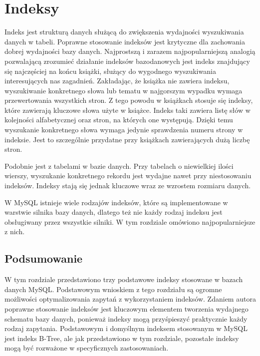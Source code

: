 \section{Indeksy}
Indeks jest strukturą danych służącą do zwiększenia wydajności wyszukiwania danych w tabeli. Poprawne stosowanie indeksów jest krytyczne dla zachowania dobrej wydajności bazy danych.
Najprostszą i zarazem najpopularniejszą analogią pozwalającą zrozumieć działanie indeksów bazodanowych jest indeks znajdujący się najczęściej na końcu książki, służący do wygodnego wyszukiwania interesujących nas zagadnień. Zakładając, że książka nie zawiera indeksu, wyszukiwanie konkretnego słowa lub tematu w najgorszym wypadku wymaga przewertowania wszystkich stron. Z tego powodu w książkach stosuje się indeksy, które zawierają kluczowe słowa użyte w książce. Indeks taki zawiera listę słów w kolejności alfabetycznej oraz stron, na których one występują. Dzięki temu wyszukanie konkretnego słowa wymaga jedynie sprawdzenia numeru strony w indeksie. Jest to szczególnie przydatne przy książkach zawierających dużą liczbę stron. 

Podobnie jest z tabelami w bazie danych. Przy tabelach o niewielkiej ilości wierszy, wyszukanie konkretnego rekordu jest wydajne nawet przy niestosowaniu indeksów. Indeksy stają się jednak kluczowe wraz ze wzrostem rozmiaru danych.

W MySQL istnieje wiele rodzajów indeksów, które są implementowane w warstwie silnika bazy danych, dlatego też nie każdy rodzaj indeksu jest obsługiwany przez wszystkie silniki. W tym rozdziale omówiono najpopularniejsze z nich.




\subsection{Podsumowanie}
W tym rozdziale przedstawiono trzy podstawowe indeksy stosowane w bazach danych MySQL. Podstawowym wnioskiem z tego rozdziału są ogromne możliwości optymalizowania zapytań z wykorzystaniem indeksów. Zdaniem autora poprawne stosowanie indeksów jest kluczowym elementem tworzenia wydajnego schematu bazy danych, ponieważ indeksy mogą przyśpieszyć praktycznie każdy rodzaj zapytania. Podstawowym i domyślnym indeksem stosowanym w MySQL jest indeks B-Tree, ale jak przedstawiono w tym rozdziale, pozostałe indeksy mogą być rozważone w specyficznych zastosowaniach.
